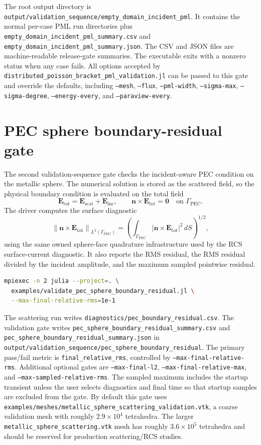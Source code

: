 \documentclass[11pt,oneside]{book}
\newcommand{\code}[1]{\texttt{#1}}
\newcommand{\vect}[1]{\boldsymbol{#1}}
\begin{document}
The root output directory is
\code{output/validation\_sequence/empty\_domain\_incident\_pml}. It contains
the normal per-case PML run directories plus
\code{empty\_domain\_incident\_pml\_summary.csv} and
\code{empty\_domain\_incident\_pml\_summary.json}. The CSV and JSON files are
machine-readable release-gate summaries. The executable exits with a nonzero
status when any case fails. All options accepted by
\code{distributed\_poisson\_bracket\_pml\_validation.jl} can be passed to this
gate and override the defaults, including \code{--mesh}, \code{--flux},
\code{--pml-width}, \code{--sigma-max}, \code{--sigma-degree},
\code{--energy-every}, and \code{--paraview-every}.

\section{PEC sphere boundary-residual gate}

The second validation-sequence gate checks the incident-aware PEC condition on
the metallic sphere. The numerical solution is stored as the scattered field,
so the physical boundary condition is evaluated on the total field
\[
  \vect E_{\mathrm{tot}}
  =
  \vect E_{\mathrm{scat}}+\vect E_{\mathrm{inc}},
  \qquad
  \vect n\times\vect E_{\mathrm{tot}}=\vect 0
  \quad\text{on }\Gamma_{\mathrm{PEC}}.
\]
The driver computes the surface diagnostic
\[
  \left\|\vect n\times\vect E_{\mathrm{tot}}\right\|_{L^2(\Gamma_{\mathrm{PEC}})}
  =
  \left(
    \int_{\Gamma_{\mathrm{PEC}}}
    \left|\vect n\times\vect E_{\mathrm{tot}}\right|^2\,dS
  \right)^{1/2},
\]
using the same owned sphere-face quadrature infrastructure used by the RCS
surface-current diagnostic. It also reports the RMS residual, the RMS residual
divided by the incident amplitude, and the maximum sampled pointwise residual.

\begin{lstlisting}[language=bash]
mpiexec -n 2 julia --project=. \
  examples/validate_pec_sphere_boundary_residual.jl \
  --max-final-relative-rms=1e-1
\end{lstlisting}

The scattering run writes
\code{diagnostics/pec\_boundary\_residual.csv}. The validation gate writes
\code{pec\_sphere\_boundary\_residual\_summary.csv} and
\code{pec\_sphere\_boundary\_residual\_summary.json} in
\code{output/validation\_sequence/pec\_sphere\_boundary\_residual}. The
primary pass/fail metric is \code{final\_relative\_rms}, controlled by
\code{--max-final-relative-rms}. Additional optional gates are
\code{--max-final-l2}, \code{--max-final-relative-max}, and
\code{--max-sampled-relative-rms}. The sampled maximum includes the startup
transient unless the user selects diagnostics and final time so that startup
samples are excluded from the gate. By default this gate uses
\code{examples/meshes/metallic\_sphere\_scattering\_validation.vtk}, a coarse
validation mesh with roughly $2.9\times 10^4$ tetrahedra. The larger
\code{metallic\_sphere\_scattering.vtk} mesh has roughly
$3.6\times 10^5$ tetrahedra and should be reserved for production
scattering/RCS studies.
\end{document}

